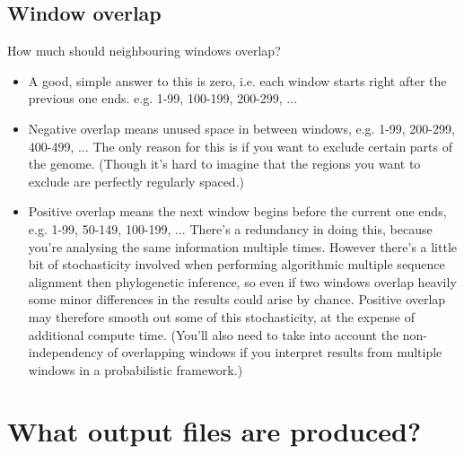 \subsection{Window overlap} \label{sec:overlap}
How much should neighbouring windows overlap?
\begin{itemize}
\item A good, simple answer to this is zero, i.e. each window starts right after the previous one ends.
e.g. 1-99, 100-199, 200-299, $\ldots$
\item Negative overlap means unused space in between windows, e.g. 1-99, 200-299, 400-499, $\ldots$
The only reason for this is if you want to exclude certain parts of the genome.
(Though it's hard to imagine that the regions you want to exclude are perfectly regularly spaced.)
\item Positive overlap means the next window begins before the current one ends, e.g. 1-99, 50-149, 100-199, $\ldots$
There's a redundancy in doing this, because you're analysing the same information multiple times.
However there's a little bit of stochasticity involved when performing algorithmic multiple sequence alignment then phylogenetic inference, so even if two windows overlap heavily some minor differences in the results could arise by chance.
Positive overlap may therefore smooth out some of this stochasticity, at the expense of additional compute time.
(You'll also need to take into account the non-independency of overlapping windows if you interpret results from multiple windows in a probabilistic framework.)
 
 \end{itemize}

\section{What output files are produced?}

